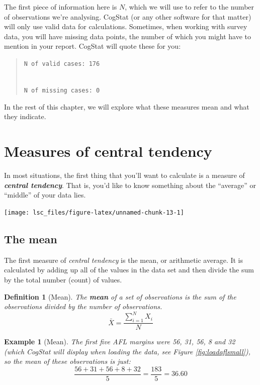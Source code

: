 \documentclass[
  11pt,
]{book}
\theoremstyle{indenteddefinition}
\newtheorem{definition}{Definition}[chapter]
\theoremstyle{indenteddefinition}
\newtheorem{example}{Example}[chapter]
\theoremstyle{definition}
\theoremstyle{definition}
\theoremstyle{remark}
\begin{document}
The first piece of information here is \(N\), which we will use to refer to the number of observations we're analysing. CogStat (or any other software for that matter) will only use valid data for calculations. Sometimes, when working with survey data, you will have missing data points, the number of which you might have to mention in your report. CogStat will quote these for you:

\begin{quote}
\texttt{N\ of\ valid\ cases:\ 176}\strut \\
\texttt{N\ of\ missing\ cases:\ 0}
\end{quote}

In the rest of this chapter, we will explore what these measures mean and what they indicate.

\hypertarget{centraltendency}{%
\section{Measures of central tendency}\label{centraltendency}}

In most situations, the first thing that you'll want to calculate is a measure of \textbf{\emph{central tendency}}. That is, you'd like to know something about the ``average'' or ``middle'' of your data lies.

\begin{center}\texttt{[image: lsc\_files/figure-latex/unnamed-chunk-13-1]} \end{center}

\hypertarget{mean}{%
\subsection{The mean}\label{mean}}

The first measure of \emph{central tendency} is the mean, or arithmetic average. It is calculated by adding up all of the values in the data set and then divide the sum by the total number (count) of values.

\begin{definition}[Mean]
\protect\hypertarget{def:defmean}{}\label{def:defmean}The \textbf{mean} of a set of observations is the sum of the observations divided by the number of observations.
\[
\bar{X} = \frac{\sum_{i=1}^N X_i}{N}
\]
\end{definition}

\begin{example}[Mean]
\protect\hypertarget{exm:exmean}{}\label{exm:exmean}The first five AFL margins were 56, 31, 56, 8 and 32 (which CogStat will display when loading the data, see Figure \ref{fig:loadaflsmall}), so the mean of these observations is just:
\[
\frac{56 + 31 + 56 + 8 + 32}{5} = \frac{183}{5} = 36.60
\]
\end{example}
\end{document}
